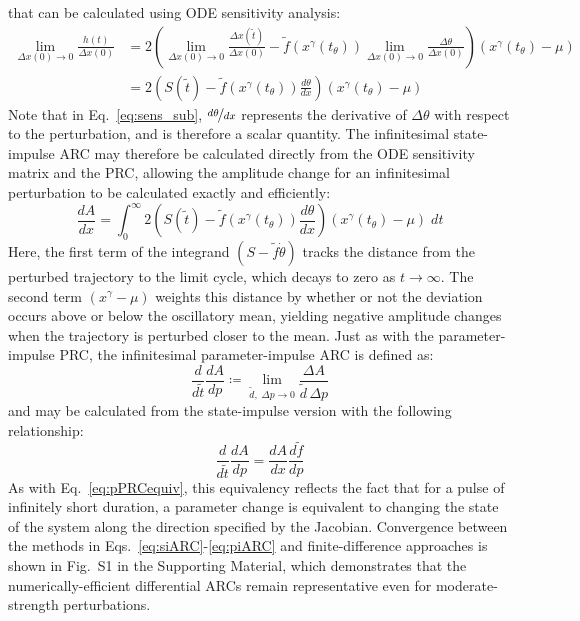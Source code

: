 \documentclass[11pt, letterpaper]{article}
\begin{document}
that can be calculated using ODE sensitivity analysis:
\begin{align}
  \lim_{\Delta x(0) \to 0} \frac{h(t)}{\Delta x(0)} &= 2\left(\lim_{\Delta x(0) \to 0}\frac{\Delta x(\tilde{t})}{\Delta x(0)} - \tilde{f}\left(x^\gamma(t_\theta)\right)\lim_{\Delta x(0) \to 0}\frac{\Delta\theta}{\Delta x(0)}\right) \left(x^\gamma(t_\theta) - \mu\right)\\
    &= 2\left(S(\tilde{t}) -
    \tilde{f}(x^\gamma(t_\theta))\frac{d\theta}{dx}\right)\left(x^\gamma(t_\theta)
    - \mu\right)\label{eq:sens_sub}
\end{align}
Note that in Eq.~\ref{eq:sens_sub}, $\nicefrac{d\theta}{dx}$ represents the
derivative of $\Delta\theta$ with respect to the perturbation, and is therefore
a scalar quantity. The infinitesimal state-impulse ARC may therefore be
calculated directly from the ODE sensitivity matrix and the PRC, allowing the
amplitude change for an infinitesimal perturbation to be calculated exactly and
efficiently:
\begin{equation}
  \frac{dA}{dx} = \int_0^\infty 2\left(S(\tilde{t}) -
    \tilde{f}(x^\gamma(t_\theta))\frac{d\theta}{dx}\right)\left(x^\gamma(t_\theta)
    - \mu\right) \; dt
    \label{eq:siARC}
\end{equation}
Here, the first term of the integrand $(S - \tilde{f}\dot{\theta})$ tracks the
distance from the perturbed trajectory to the limit cycle, which decays to zero
as $t \to \infty$. The second term $(x^\gamma - \mu)$ weights this distance by
whether or not the deviation occurs above or below the oscillatory mean,
yielding negative amplitude changes when the trajectory is perturbed closer to
the mean. Just as with the parameter-impulse PRC, the infinitesimal
parameter-impulse ARC is defined as:
\begin{equation}
  \frac{d}{d\tilde{t}}\frac{dA}{dp} \coloneqq \lim_{\tilde{d},\; \Delta p \to 0}
  \frac{\Delta A}{\tilde{d}\, \Delta p}
\end{equation}
and may be calculated from the state-impulse version with the following
relationship:
\begin{equation}
  \frac{d}{d\tilde{t}}\frac{dA}{dp} = \frac{dA}{dx}\frac{d\tilde{f}}{dp}
    \label{eq:piARC}
\end{equation}
As with Eq.~\ref{eq:pPRCequiv}, this equivalency reflects the fact that for a
pulse of infinitely short duration, a parameter change is equivalent to changing
the state of the system along the direction specified by the Jacobian.
Convergence between the methods in Eqs.~\ref{eq:siARC}-\ref{eq:piARC} and
finite-difference approaches is shown in Fig.~S1 in the Supporting Material,
which demonstrates that the numerically-efficient differential ARCs remain
representative even for moderate-strength perturbations.
\end{document}
